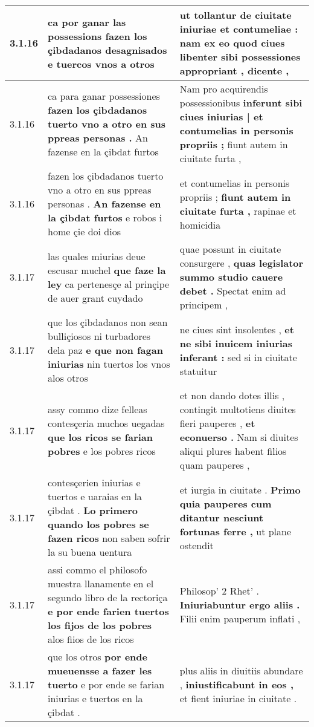 \begin{tabular}{|p{1cm}|p{6.5cm}|p{6.5cm}|}
3.1.16 & ca por ganar las possessions \textbf{ fazen los çibdadanos desagnisados } e tuercos vnos a otros & ut tollantur de ciuitate iniuriae et contumeliae : \textbf{ nam ex eo quod ciues libenter sibi possessiones appropriant , } dicente , \\\hline
3.1.16 & ca para ganar possessiones \textbf{ fazen los çibdadanos tuerto vno a otro en sus ppreas personas . } An fazense en la çibdat furtos & Nam pro acquirendis possessionibus \textbf{ inferunt sibi ciues iniurias | et contumelias in personis propriis ; } fiunt autem in ciuitate furta , \\\hline
3.1.16 & fazen los çibdadanos tuerto vno a otro en sus ppreas personas . \textbf{ An fazense en la çibdat furtos } e robos i home çie doi dios & et contumelias in personis propriis ; \textbf{ fiunt autem in ciuitate furta , } rapinae et homicidia \\\hline
3.1.17 & las quales miurias deue escusar muchel \textbf{ que faze la ley } ca pertenesçe al prinçipe de auer grant cuydado & quae possunt in ciuitate consurgere , \textbf{ quas legislator summo studio cauere debet . } Spectat enim ad principem , \\\hline
3.1.17 & que los çibdadanos non sean bulliçiosos ni turbadores dela paz \textbf{ e que non fagan iniurias } nin tuertos los vnos alos otros & ne ciues sint insolentes , \textbf{ et ne sibi inuicem iniurias inferant : } sed si in ciuitate statuitur \\\hline
3.1.17 & assy commo dize felleas contesçeria muchos uegadas \textbf{ que los ricos se farian pobres } e los pobres ricos & et non dando dotes illis , contingit multotiens diuites fieri pauperes , \textbf{ et econuerso . } Nam si diuites aliqui plures habent filios quam pauperes , \\\hline
3.1.17 & contesçerien iniurias e tuertos e uaraias en la çibdat . \textbf{ Lo primero quando los pobres se fazen ricos } non saben sofrir la su buena uentura & et iurgia in ciuitate . \textbf{ Primo quia pauperes cum ditantur nesciunt fortunas ferre , } ut plane ostendit \\\hline
3.1.17 & assi commo el philosofo muestra llanamente en el segundo libro de la rectoriça \textbf{ e por ende farien tuertos los fijos de los pobres } alos fiios de los ricos & Philosop’ 2 Rhet’ . \textbf{ Iniuriabuntur ergo aliis . } Filii enim pauperum inflati , \\\hline
3.1.17 & que los otros \textbf{ por ende mueuensse a fazer les tuerto } e por ende se farian iniurias e tuertos en la çibdat . & plus aliis in diuitiis abundare , \textbf{ iniustificabunt in eos , } et fient iniuriae in ciuitate . \\\hline

\end{tabular}
